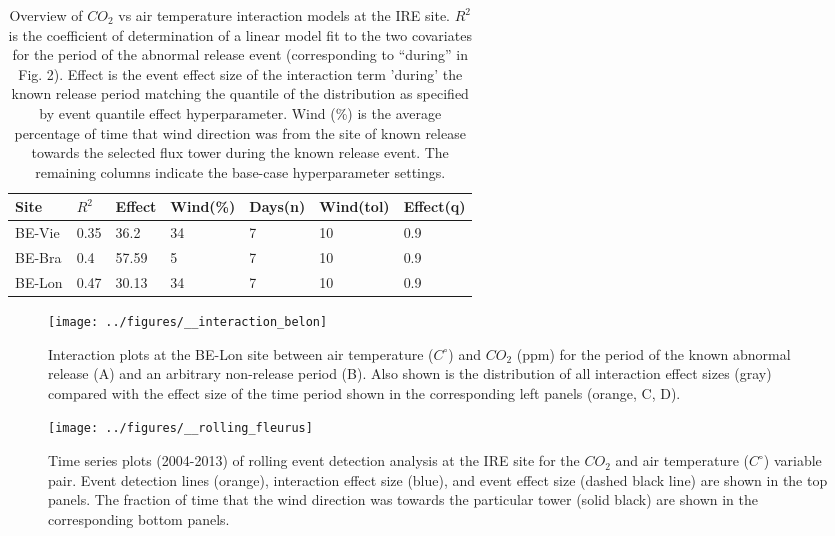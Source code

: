 \documentclass{article}
\begin{document}
\begin{table}[]
	\centering
	\caption{Overview of $CO_2$ vs air temperature interaction models at the IRE site. $R^2$ is the coefficient of determination of a linear model fit to the two covariates for the period of the abnormal release event (corresponding to “during” in Fig. 2). Effect is the event effect size of the interaction term 'during' the known release period matching the quantile of the distribution as specified by event quantile effect hyperparameter. Wind (\%) is the average percentage of time that wind direction was from the site of known release towards the selected flux tower during the known release event. The remaining columns indicate the base-case hyperparameter settings.}
	\begin{tabular}{@{}lllllll@{}}
	\toprule
	Site & $R^2$ & Effect & Wind(\%) & Days(n) & Wind(tol) & Effect(q) \\ \midrule
	BE-Vie & 0.35 & 36.2  & 34 & 7 & 10 & 0.9  \\
	BE-Bra & 0.4 & 57.59  & 5 & 7 & 10 & 0.9 \\
	BE-Lon & 0.47 & 30.13 & 34 & 7 & 10 & 0.9 \\ \bottomrule
	\end{tabular}	
	\label{table:1}
	\end{table}

\begin{figure}
	\centering
	\texttt{[image: ../figures/\_\_interaction\_belon]}
	\caption{Interaction plots at the BE-Lon site between air temperature ($C^{\circ}$) and $CO_2$ (ppm) for the period of the known abnormal release (A) and an arbitrary non-release period (B). Also shown is the distribution of all interaction effect sizes (gray) compared with the effect size of the time period shown in the corresponding left panels (orange, C, D).}
	\label{fig:interaction}
\end{figure}


\begin{figure}
	\centering
	\texttt{[image: ../figures/\_\_rolling\_fleurus]}
	\caption{Time series plots (2004-2013) of rolling event detection analysis at the IRE site for the $CO_2$ and air temperature ($C^{\circ}$) variable pair. Event detection lines (orange), interaction effect size (blue), and event effect size (dashed black line) are shown in the top panels. The fraction of time that the wind direction was towards the particular tower (solid black) are shown in the corresponding bottom panels.}
	\label{fig:rolling}
\end{figure}
\end{document}

